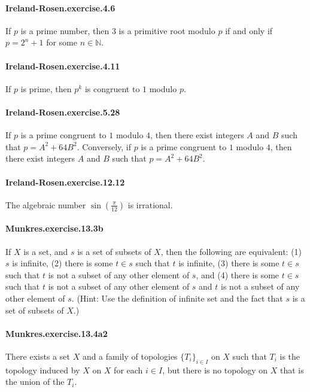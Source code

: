\documentclass{article}
\begin{document}
\paragraph{Ireland-Rosen.exercise.4.6} If $p$ is a prime number, then $3$ is a primitive root modulo $p$ if and only if $p = 2^n + 1$ for some $n \in \mathbb{N}$.

\paragraph{Ireland-Rosen.exercise.4.11} If $p$ is prime, then $p^k$ is congruent to $1$ modulo $p$.

\paragraph{Ireland-Rosen.exercise.5.28} If $p$ is a prime congruent to $1$ modulo $4$, then there exist integers $A$ and $B$ such that $p = A^2 + 64B^2$. Conversely, if $p$ is a prime congruent to $1$ modulo $4$, then there exist integers $A$ and $B$ such that $p = A^2 + 64B^2$.

\paragraph{Ireland-Rosen.exercise.12.12} The algebraic number $\sin(\frac{\pi}{12})$ is irrational.

\paragraph{Munkres.exercise.13.3b} If $X$ is a set, and $s$ is a set of subsets of $X$, then the following are equivalent: (1) $s$ is infinite, (2) there is some $t \in s$ such that $t$ is infinite, (3) there is some $t \in s$ such that $t$ is not a subset of any other element of $s$, and (4) there is some $t \in s$ such that $t$ is not a subset of any other element of $s$ and $t$ is not a subset of any other element of $s$. (Hint: Use the definition of infinite set and the fact that $s$ is a set of subsets of $X$.)

\paragraph{Munkres.exercise.13.4a2} There exists a set $X$ and a family of topologies $\{T_i\}_{i\in I}$ on $X$ such that $T_i$ is the topology induced by $X$ on $X$ for each $i\in I$, but there is no topology on $X$ that is the union of the $T_i$.
\end{document}
